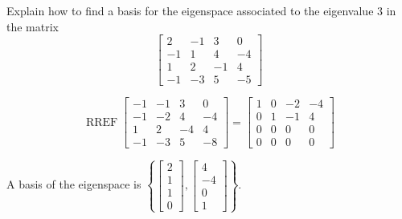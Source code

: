 
\begin{exerciseStatement}


Explain how to find a basis for the eigenspace associated to the eigenvalue \( 3 \) in the matrix \[ \left[\begin{array}{cccc}
2 & -1 & 3 & 0 \\
-1 & 1 & 4 & -4 \\
1 & 2 & -1 & 4 \\
-1 & -3 & 5 & -5
\end{array}\right] \]


\end{exerciseStatement}
    
\begin{exerciseAnswer} 


\[\operatorname{RREF} \left[\begin{array}{cccc}
-1 & -1 & 3 & 0 \\
-1 & -2 & 4 & -4 \\
1 & 2 & -4 & 4 \\
-1 & -3 & 5 & -8
\end{array}\right] = \left[\begin{array}{cccc}
1 & 0 & -2 & -4 \\
0 & 1 & -1 & 4 \\
0 & 0 & 0 & 0 \\
0 & 0 & 0 & 0
\end{array}\right] \]



A basis of the eigenspace is \( \left\{ \left[\begin{array}{c}
2 \\
1 \\
1 \\
0
\end{array}\right] , \left[\begin{array}{c}
4 \\
-4 \\
0 \\
1
\end{array}\right] \right\} \).


\end{exerciseAnswer}
    
